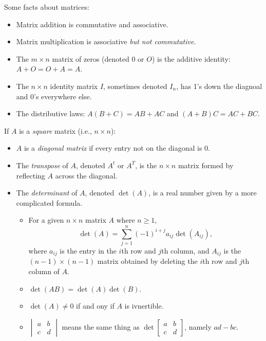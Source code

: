 \begin{facts}
	Some facts about matrices:
	\begin{itemize}
		\item Matrix addition is commutative and associative.
		\item Matrix multiplication is associative \emph{but not commutative}.
		\item The $m \times n$ matrix of zeros (denoted 0 or $O$) is the additive
			identity: $A + O = O + A = A$.
		\item The $n \times n$ identity matrix $I$, sometimes denoted $I_n$, has 1's
			down the diagnoal and 0's everywhere else.
		\item The distributive laws: $A(B + C) = AB + AC$ and $(A + B)C = AC + BC$.
	\end{itemize}

	If $A$ is a \emph{square} matrix (i.e., $n \times n$):
	\begin{itemize}
		\item $A$ is a \emph{diagonal matrix} if every entry not on the diagonal is
			0.
		\item The \emph{transpose} of $A$, denoted $A^t$ or $A^T$, is the $n \times
			n$ matrix formed by reflecting $A$ across the diagonal.
		\item The \emph{determinant} of $A$, denoted $\det(A)$, is a real number
			given by a more complicated formula.
			\begin{itemize}
				\item For a given $n \times n$ matrix $A$ where $n \geq 1$,
					\[
						\det(A) = \sum_{j = 1}^n {(-1)}^{i + j} a_{ij} \det(A_{ij}),
					\]
					where $a_{ij}$ is the entry in the $i$th row and $j$th column, and
					$A_{ij}$ is the $(n - 1) \times (n -1)$ matrix obtained by deleting
					the $i$th row and $j$th column of $A$.
				\item $\det(AB) = \det(A) \det(B)$.
				\item $\det(A) \neq 0$ if and ony if $A$ is ivnertible.
				\item $
					\begin{vmatrix}
						a & b \\
						c & d
					\end{vmatrix}$
					means the same thing as
					$\det
					\begin{bmatrix}
						a & b \\
						c & d
					\end{bmatrix}$,
					namely $ad - bc$.
			\end{itemize}
	\end{itemize}
\end{facts}

